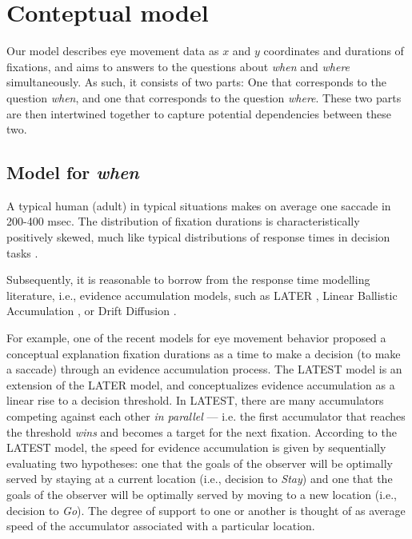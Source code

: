 \documentclass{article}
\begin{document}
\section{Conteptual model}

Our model describes eye movement data as $x$ and $y$ coordinates and durations of fixations, and aims to answers to the questions about \textit{when} and \textit{where} simultaneously. As such, it consists of two parts: One that corresponds to the question \textit{when}, and one that corresponds to the question \textit{where}. These two parts are then intertwined together to capture potential dependencies between these two.


\subsection{Model for \textit{when}}

A typical human (adult) in typical situations makes on average one saccade in 200-400 msec. The distribution of fixation durations is characteristically positively skewed, much like typical distributions of response times in decision tasks \citep{palmer2011shapes}.

Subsequently, it is reasonable to borrow from the response time modelling literature, i.e., evidence accumulation models, such as LATER \citep{carpenter1995neural}, Linear Ballistic Accumulation \citep{brown2008simplest}, or Drift Diffusion \citep{ratcliff2008diffusion}.

For example, one of the recent models for eye movement behavior \citep[LATEST; ][]{tatler2017latest} proposed a conceptual explanation fixation durations as a time to make a decision (to make a saccade) through an evidence accumulation process. The LATEST model is an extension of the LATER model, and conceptualizes evidence accumulation as a linear rise to a decision threshold. In LATEST, there are many accumulators competing against each other \textit{in parallel} --- i.e. the first accumulator that reaches the threshold \textit{wins} and becomes a target for the next fixation. According to the LATEST model, the speed for evidence accumulation is given by sequentially evaluating two hypotheses: one that the goals of the observer will be optimally served by staying at a current location (i.e., decision to \textit{Stay}) and one that the goals of the observer will be optimally served by moving to a new location (i.e., decision to \textit{Go}). The degree of support to one or another is thought of as average speed of the accumulator associated with a particular location.
\end{document}
